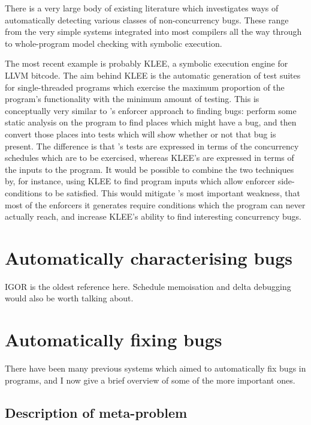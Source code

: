 There is a very large body of existing literature which investigates
ways of automatically detecting various classes of non-concurrency
bugs.  These range from the very simple systems integrated into most
compilers\needCite{} all the way through to whole-program model
checking with symbolic execution\needCite{}.  

The most recent example is probably KLEE\needCite{}, a symbolic
execution engine for LLVM bitcode\needCite{}.  The aim behind KLEE is
the automatic generation of test suites for single-threaded programs
which exercise the maximum proportion of the program's functionality
with the minimum amount of testing.  This is conceptually very similar
to {\technique}'s enforcer approach to finding bugs: perform some
static analysis on the program to find places which might have a bug,
and then convert those places into tests which will show whether or
not that bug is present.  The difference is that {\technique}'s tests
are expressed in terms of the concurrency schedules which are to be
exercised, whereas KLEE's are expressed in terms of the inputs to the
program.  It would be possible to combine the two techniques by, for
instance, using KLEE to find program inputs which allow {\technique}
enforcer side-conditions to be satisfied.  This would mitigate
{\technique}'s most important weakness, that most of the enforcers it
generates require conditions which the program can never actually
reach, and increase KLEE's ability to find interesting concurrency
bugs.

\section{Automatically characterising bugs}

IGOR is the oldest reference here.  Schedule memoisation and delta
debugging would also be worth talking about.  

\section{Automatically fixing bugs}

There have been many previous systems which aimed to automatically fix
bugs in programs, and I now give a brief overview of some of the more
important ones.

\subsection{Description of meta-problem}

